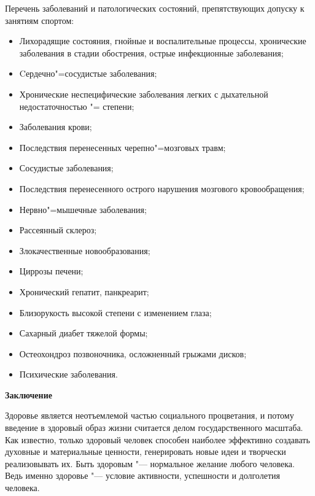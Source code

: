 \begin{flushleft}
Перечень заболеваний и патологических состояний, препятствующих допуску к занятиям спортом:
\begin{itemize}
    \item Лихорадящие состояния, гнойные и воспалительные процессы,
    хронические заболевания в стадии обострения, острые инфекционные
    заболевания;
    \item Cердечно"=сосудистые заболевания;
    \item Хронические неспецифические заболевания легких с дыхательной
    недостаточностью \MakeUppercase{}"=\MakeUppercase{} степени;
    \item Заболевания крови;
    \item Последствия перенесенных черепно"=мозговых травм;
    \item Сосудистые заболевания;
    \item Последствия перенесенного острого нарушения мозгового
    кровообращения;
    \item Нервно"=мышечные заболевания;
    \item Рассеянный склероз;
    \item Злокачественные новообразования;
    \item Циррозы печени;
    \item Хронический гепатит, панкреарит;
    \item Близорукость высокой степени с изменением глаза;
    \item Сахарный диабет тяжелой формы;
    \item Остеохондроз позвоночника, осложненный грыжами дисков;
    \item Психические заболевания.
\end{itemize}

\newpage
\begin{center}
    \textbf{Заключение}
\end{center}
\vspace*{14pt}

Здоровье является неотъемлемой частью социального процветания, и потому
введение в здоровый образ жизни считается делом государственного масштаба.
Как известно, только здоровый человек способен наиболее эффективно создавать 
духовные и материальные ценности, генерировать новые идеи и творчески реализовывать их.
Быть здоровым "--- нормальное желание любого человека. Ведь именно здоровье "--- условие активности, успешности и долголетия человека.\\


\end{flushleft}

